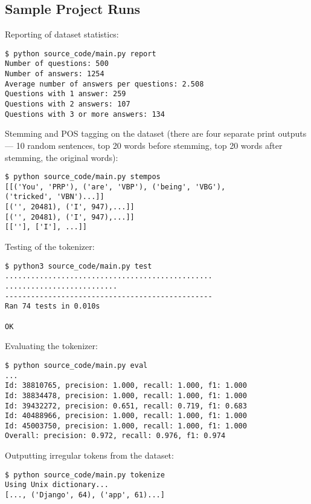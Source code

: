 \subsection*{Sample Project Runs}

Reporting of dataset statistics:

\begin{lstlisting}
$ python source_code/main.py report
Number of questions: 500
Number of answers: 1254
Average number of answers per questions: 2.508
Questions with 1 answer: 259
Questions with 2 answers: 107
Questions with 3 or more answers: 134
\end{lstlisting}

Stemming and POS tagging on the dataset (there are four separate print outputs
--- 10 random sentences, top 20 words before stemming, top 20 words after
stemming, the original words):

\begin{lstlisting}
$ python source_code/main.py stempos
[[('You', 'PRP'), ('are', 'VBP'), ('being', 'VBG'),
('tricked', 'VBN')...]]
[('', 20481), ('I', 947),...]]
[('', 20481), ('I', 947),...]]
[[''], ['I'], ...]]
\end{lstlisting}

Testing of the tokenizer:

\begin{lstlisting}
$ python3 source_code/main.py test
................................................
..........................
------------------------------------------------
Ran 74 tests in 0.010s

OK
\end{lstlisting}

Evaluating the tokenizer:

\begin{lstlisting}
$ python source_code/main.py eval
...
Id: 38810765, precision: 1.000, recall: 1.000, f1: 1.000
Id: 38834478, precision: 1.000, recall: 1.000, f1: 1.000
Id: 39432272, precision: 0.651, recall: 0.719, f1: 0.683
Id: 40488966, precision: 1.000, recall: 1.000, f1: 1.000
Id: 45003750, precision: 1.000, recall: 1.000, f1: 1.000
Overall: precision: 0.972, recall: 0.976, f1: 0.974
\end{lstlisting}

Outputting irregular tokens from the dataset:

\begin{lstlisting}
$ python source_code/main.py tokenize
Using Unix dictionary...
[..., ('Django', 64), ('app', 61)...]
\end{lstlisting}


